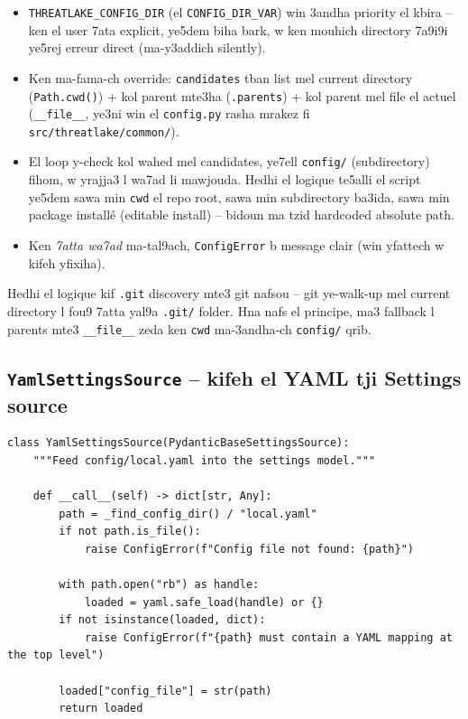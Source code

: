 \documentclass[11pt,a4paper]{report}
\DeclareRobustCommand{\code}[1]{\texttt{#1}}
\begin{document}
\begin{itemize}
  \item \code{THREATLAKE\_CONFIG\_DIR} (el \code{CONFIG\_DIR\_VAR}) win 3andha
        priority el kbira -- ken el user 7ata explicit, ye5dem biha bark, w ken
        mouhich directory 7a9i9i ye5rej erreur direct (ma-y3addich silently).
  \item Ken ma-fama-ch override: \code{candidates} tban list mel current
        directory (\code{Path.cwd()}) + kol parent mte3ha (\code{.parents}) +
        kol parent mel file el actuel (\code{\_\_file\_\_}, ye3ni win el
        \code{config.py} rasha mrakez fi \code{src/threatlake/common/}).
  \item El loop y-check kol wahed mel candidates, ye7ell \code{config/}
        (subdirectory) fihom, w yrajja3 l wa7ad li mawjouda. Hedhi el logique
        te5alli el script ye5dem sawa min \code{cwd} el repo root, sawa min
        subdirectory ba3ida, sawa min package installé (editable install) --
        bidoun ma tzid hardcoded absolute path.
  \item Ken \emph{7atta wa7ad} ma-tal9ach, \code{ConfigError} b message clair
        (win yfattech w kifeh yfixiha).
\end{itemize}

\begin{analogy}
Hedhi el logique kif \code{.git} discovery mte3 git nafsou -- git ye-walk-up
mel current directory l fou9 7atta yal9a \code{.git/} folder. Hna nafs el
principe, ma3 fallback l parents mte3 \code{\_\_file\_\_} zeda ken \code{cwd}
ma-3andha-ch \code{config/} qrib.
\end{analogy}

\subsection{\code{YamlSettingsSource} -- kifeh el YAML tji Settings source}

\begin{lstlisting}[style=pystyle]
class YamlSettingsSource(PydanticBaseSettingsSource):
    """Feed config/local.yaml into the settings model."""

    def __call__(self) -> dict[str, Any]:
        path = _find_config_dir() / "local.yaml"
        if not path.is_file():
            raise ConfigError(f"Config file not found: {path}")

        with path.open("rb") as handle:
            loaded = yaml.safe_load(handle) or {}
        if not isinstance(loaded, dict):
            raise ConfigError(f"{path} must contain a YAML mapping at the top level")

        loaded["config_file"] = str(path)
        return loaded
\end{lstlisting}
\end{document}
